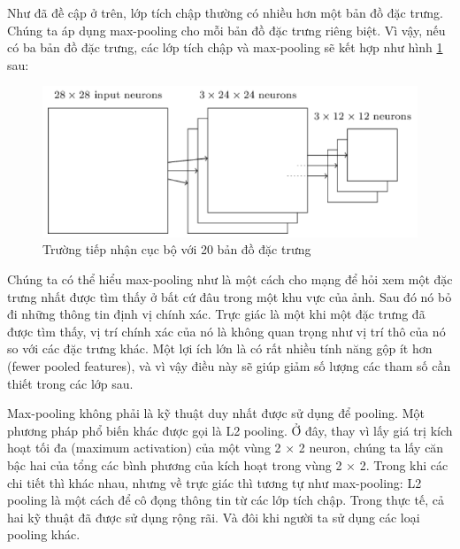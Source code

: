 Như đã đề cập ở trên, lớp tích chập thường có nhiều hơn một bản đồ đặc trưng. Chúng ta áp dụng max-pooling cho mỗi bản đồ đặc trưng riêng biệt. Vì vậy, nếu có ba bản đồ đặc trưng, các lớp tích chập và max-pooling sẽ kết hợp như hình \ref{fig:maxpoolingvoibabandodactrung} sau:
\begin{figure}[H]
	\centering
	\includegraphics[width=0.8\linewidth]{images/maxpoolingvoibabandodactrung.png}
	\caption{Trường tiếp nhận cục bộ với 20 bản đồ đặc trưng}
	\label{fig:maxpoolingvoibabandodactrung}
\end{figure}
Chúng ta có thể hiểu max-pooling như là một cách cho mạng để hỏi xem một đặc trưng nhất được tìm thấy ở bất cứ đâu trong một khu vực của ảnh. Sau đó nó bỏ đi những thông tin định vị chính xác. Trực giác là một khi một đặc trưng đã được tìm thấy, vị trí chính xác của nó là không quan trọng như vị trí thô của nó so với các đặc trưng khác. Một lợi ích lớn là có rất nhiều tính năng gộp ít hơn (fewer pooled features), và vì vậy điều này sẽ giúp giảm số lượng các tham số cần thiết trong các lớp sau.

Max-pooling không phải là kỹ thuật duy nhất được sử dụng để pooling. Một phương pháp phổ biến khác được gọi là L2 pooling. Ở đây, thay vì lấy giá trị kích hoạt tối đa (maximum activation) của một vùng 2 × 2 neuron, chúng ta lấy căn bậc hai của tổng các bình phương của kích hoạt trong vùng 2 × 2. Trong khi các chi tiết thì khác nhau, nhưng về trực giác thì tương tự như max-pooling: L2 pooling là một cách để cô đọng thông tin từ các lớp tích chập. Trong thực tế, cả hai kỹ thuật đã được sử dụng rộng rãi. Và đôi khi người ta sử dụng các loại pooling khác.

